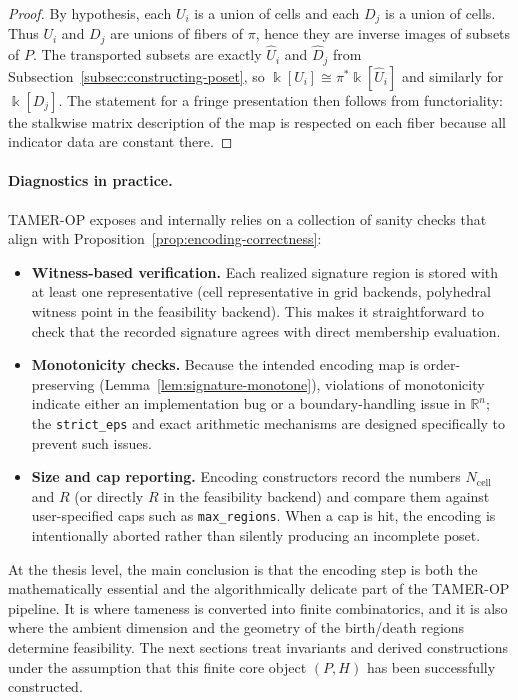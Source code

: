 \documentclass{article}
\newcommand{\kk}{\Bbbk}
\newcommand{\<}{\langle}
\renewcommand{\>}{\rangle}
\theoremstyle{definition}
\theoremstyle{remark}
\begin{document}
	\begin{proof}
		By hypothesis, each $U_i$ is a union of cells and each $D_j$ is a union of cells.
		Thus $U_i$ and $D_j$ are unions of fibers of $\pi$, hence they are inverse images of
		subsets of $P$.  The transported subsets are exactly $\widehat{U}_i$ and
		$\widehat{D}_j$ from Subsection~\ref{subsec:constructing-poset}, so
		$\kk[U_i]\cong \pi^*\kk[\widehat{U}_i]$ and similarly for $\kk[D_j]$.
		The statement for a fringe presentation then follows from functoriality: the stalkwise
		matrix description of the map is respected on each fiber because all indicator data are
		constant there.
	\end{proof}
	
	\paragraph{Diagnostics in practice.}
	TAMER-OP exposes and internally relies on a collection of sanity checks that align with
	Proposition~\ref{prop:encoding-correctness}:
	\begin{itemize}
		\item \textbf{Witness-based verification.}  Each realized signature region is stored
		with at least one representative (cell representative in grid backends, polyhedral
		witness point in the feasibility backend).  This makes it straightforward to check that
		the recorded signature agrees with direct membership evaluation.
		\item \textbf{Monotonicity checks.}  Because the intended encoding map is order-preserving
		(Lemma~\ref{lem:signature-monotone}), violations of monotonicity indicate either an
		implementation bug or a boundary-handling issue in $\mathbb{R}^n$; the \texttt{strict\_eps}
		and exact arithmetic mechanisms are designed specifically to prevent such issues.
		\item \textbf{Size and cap reporting.}  Encoding constructors record the numbers
		$N_{\mathrm{cell}}$ and $R$ (or directly $R$ in the feasibility backend) and compare them
		against user-specified caps such as \texttt{max\_regions}.  When a cap is hit, the encoding
		is intentionally aborted rather than silently producing an incomplete poset.
	\end{itemize}
	
	At the thesis level, the main conclusion is that the encoding step is both the
	mathematically essential and the algorithmically delicate part of the TAMER-OP pipeline.
	It is where tameness is converted into finite combinatorics, and it is also where the
	ambient dimension and the geometry of the birth/death regions determine feasibility.
	The next sections treat invariants and derived constructions under the assumption that
	this finite core object $(P,H)$ has been successfully constructed.
	
\end{document}
